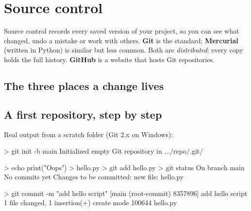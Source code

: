 \section{Source control}

Source control records every saved version of your project, so you can see what changed, undo a mistake
or work with others. \textbf{Git} is the standard; \textbf{Mercurial} (written in Python) is similar but
less common. Both are \emph{distributed}: every copy holds the full history. \textbf{GitHub} is a website
that hosts Git repositories.

\subsection{The three places a change lives}

\begin{center}
\end{center}

\subsection{A first repository, step by step}

Real output from a scratch folder (Git 2.x on Windows):

\begin{rawcode}
> git init -b main
Initialized empty Git repository in .../repo/.git/

> echo print("Oops") > hello.py
> git add hello.py
> git status
On branch main
No commits yet
Changes to be committed:
        new file:   hello.py

> git commit -m "add hello script"
[main (root-commit) 8357896] add hello script
 1 file changed, 1 insertion(+)
 create mode 100644 hello.py
\end{rawcode}

